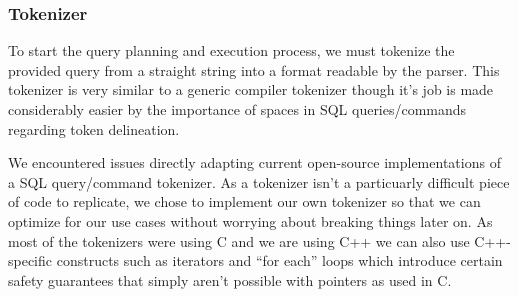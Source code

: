 \documentclass[letterpaper, 12pt]{article}
\begin{document}

\subsubsection{Tokenizer}
To start the query planning and execution process, we must tokenize the provided query
from a straight string into a format readable by the parser. This tokenizer is very
similar to a generic compiler tokenizer though it's job is made considerably easier 
by the importance of spaces in SQL queries/commands regarding token delineation.
\par\vspace{\baselineskip}
We encountered issues directly adapting current open-source implementations of a
SQL query/command tokenizer. As a tokenizer isn't a particuarly difficult piece of 
code to replicate, we chose to implement our own tokenizer so that
we can optimize for our use cases without worrying about breaking things later on.
As most of the tokenizers were using C and we are using C++ we can also use C++-specific
constructs such as iterators and ``for each'' loops which introduce certain safety guarantees 
that simply aren't possible with pointers as used in C.
\end{document}
